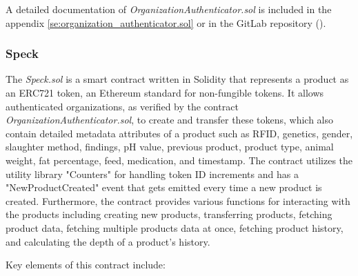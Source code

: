 \documentclass[oneside,a4paper,12pt, colorinlistoftodos]{article} %
\begin{document}
A detailed documentation of \textit{OrganizationAuthenticator.sol} is included in the appendix \ref{se:organization_authenticator.sol} or in the GitLab repository (\cite{HellerAoun}).


\subsubsection{Speck}
The \textit{Speck.sol} is a smart contract written in Solidity that represents a product as an ERC721 token, an Ethereum standard for non-fungible tokens. It allows authenticated organizations, as verified by the contract \textit{OrganizationAuthenticator.sol}, to create and transfer these tokens, which also contain detailed metadata attributes of a product such as RFID, genetics, gender, slaughter method, findings, pH value, previous product, product type, animal weight, fat percentage, feed, medication, and timestamp. The contract utilizes the utility library "Counters" for handling token ID increments and has a "NewProductCreated" event that gets emitted every time a new product is created. Furthermore, the contract provides various functions for interacting with the products including creating new products, transferring products, fetching product data, fetching multiple products data at once, fetching product history, and calculating the depth of a product's history.

Key elements of this contract include:
\end{document}
